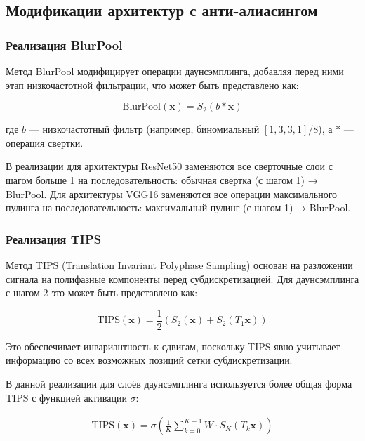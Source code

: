 \subsection{Модификации архитектур с анти-алиасингом}
\label{sec:architectures}

\subsubsection{Реализация BlurPool}
\label{sec:architectures:blurpool}

Метод BlurPool модифицирует операции даунсэмплинга, добавляя перед ними этап низкочастотной фильтрации, что может быть представлено как:

\begin{equation}
\text{BlurPool}(\mathbf{x}) = S_2(b * \mathbf{x})
\end{equation}

где $b$ — низкочастотный фильтр (например, биномиальный $[1, 3, 3, 1]/8$), а $*$ — операция свертки. 

В реализации для архитектуры ResNet50 заменяются все сверточные слои с шагом больше 1 на последовательность: обычная свертка (с шагом 1) → BlurPool. Для архитектуры VGG16 заменяются все операции максимального пулинга на последовательность: максимальный пулинг (с шагом 1) → BlurPool.

\subsubsection{Реализация TIPS}
\label{sec:architectures:tips}

Метод TIPS (Translation Invariant Polyphase Sampling) основан на разложении сигнала на полифазные компоненты перед субдискретизацией. Для даунсэмплинга с шагом 2 это может быть представлено как:

\begin{equation}
\text{TIPS}(\mathbf{x}) = \frac{1}{2}(S_2(\mathbf{x}) + S_2(T_1 \mathbf{x}))
\end{equation}

Это обеспечивает инвариантность к сдвигам, поскольку TIPS явно учитывает информацию со всех возможных позиций сетки субдискретизации.

В данной реализации для слоёв даунсэмплинга используется более общая форма TIPS с функцией активации $\sigma$:

\begin{multline}
\text{TIPS}(\mathbf{x}) = \sigma\left(\frac{1}{K}\sum_{k=0}^{K-1} W \cdot S_K(T_k \mathbf{x})\right)
\end{multline}

